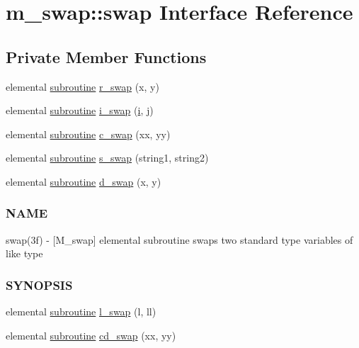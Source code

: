 \hypertarget{interfacem__swap_1_1swap}{}\section{m\+\_\+swap\+:\+:swap Interface Reference}
\label{interfacem__swap_1_1swap}
\subsection*{Private Member Functions}
\begin{DoxyCompactItemize}
\item 
elemental \hyperlink{M__stopwatch_83_8txt_acfbcff50169d691ff02d4a123ed70482}{subroutine} \hyperlink{interfacem__swap_1_1swap_ac61beb6c8071bd0954ec83e967e51809}{r\+\_\+swap} (x, y)
\item 
elemental \hyperlink{M__stopwatch_83_8txt_acfbcff50169d691ff02d4a123ed70482}{subroutine} \hyperlink{interfacem__swap_1_1swap_a699e0cac27eee46b38b357d8116a5c61}{i\+\_\+swap} (\hyperlink{intro__blas1_83_8txt_a8ba82a50c0c2c12d5f6a77f7e4651c0b}{i}, \hyperlink{exit_87_8txt_a8921ef29c441e427867c54bd3b2462ba}{j})
\item 
elemental \hyperlink{M__stopwatch_83_8txt_acfbcff50169d691ff02d4a123ed70482}{subroutine} \hyperlink{interfacem__swap_1_1swap_abc8e098e94291dfc161f962397cc2ace}{c\+\_\+swap} (xx, yy)
\item 
elemental \hyperlink{M__stopwatch_83_8txt_acfbcff50169d691ff02d4a123ed70482}{subroutine} \hyperlink{interfacem__swap_1_1swap_a1876fd6b10405d2834a760ba8e006bbf}{s\+\_\+swap} (string1, string2)
\item 
elemental \hyperlink{M__stopwatch_83_8txt_acfbcff50169d691ff02d4a123ed70482}{subroutine} \hyperlink{interfacem__swap_1_1swap_af40eecd62f8cb1bbe7d207c06163bf64}{d\+\_\+swap} (x, y)
\begin{DoxyCompactList}\small\item\em \subsubsection*{N\+A\+ME}

swap(3f) -\/ \mbox{[}M\+\_\+swap\mbox{]} elemental subroutine swaps two standard type variables of like type \subsubsection*{S\+Y\+N\+O\+P\+S\+IS}\end{DoxyCompactList}\item 
elemental \hyperlink{M__stopwatch_83_8txt_acfbcff50169d691ff02d4a123ed70482}{subroutine} \hyperlink{interfacem__swap_1_1swap_ad165c5b42c04e0d29288657076615de6}{l\+\_\+swap} (l, ll)
\item 
elemental \hyperlink{M__stopwatch_83_8txt_acfbcff50169d691ff02d4a123ed70482}{subroutine} \hyperlink{interfacem__swap_1_1swap_a65fb0d905f22f4e6e75a3d7ba047a3e3}{cd\+\_\+swap} (xx, yy)
\end{DoxyCompactItemize}


